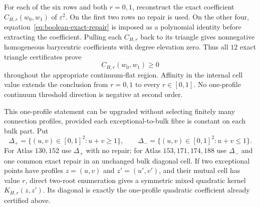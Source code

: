 \documentclass[11pt]{article}
\begin{document}
For each of the six rows and both $r=0,1$, reconstruct the exact coefficient
$C_{H,r}(w_0,w_1)$ of $\varepsilon^2$.  On the first two rows no repair is
used.  On the other four, equation~\eqref{eq:boolean-exact-repair} is imposed
as a polynomial identity before extracting the coefficient.  Pulling each
$C_{H,r}$ back to its triangle gives nonnegative homogeneous barycentric
coefficients with degree elevation zero.  Thus all $12$ exact triangle
certificates prove
\[
 C_{H,r}(w_0,w_1)\geq0
\]
throughout the appropriate continuum-flat region.  Affinity in the internal
cell value extends the conclusion from $r=0,1$ to every $r\in[0,1]$.  No
one-profile continuum threshold direction is negative at second order.

This one-profile statement can be upgraded without selecting finitely many
connection profiles, provided each exceptional-to-bulk fibre is constant on
each bulk part.  Put
\[
 \Delta_+=\{(u,v)\in[0,1]^2:u+v\geq1\},
 \qquad
 \Delta_-=\{(u,v)\in[0,1]^2:u+v\leq1\}.
\]
For Atlas $130,152$ use $\Delta_+$ with no repair; for Atlas
$153,171,174,188$ use $\Delta_-$ and one common exact repair in an
unchanged bulk diagonal cell.  If two exceptional points have profiles
$z=(u,v)$ and $z'=(u',v')$, and their mutual cell has value $r$, direct
two-root enumeration gives a symmetric mixed quadratic kernel
$K_{H,r}(z,z')$.  Its diagonal is exactly the one-profile quadratic
coefficient already certified above.
\end{document}
